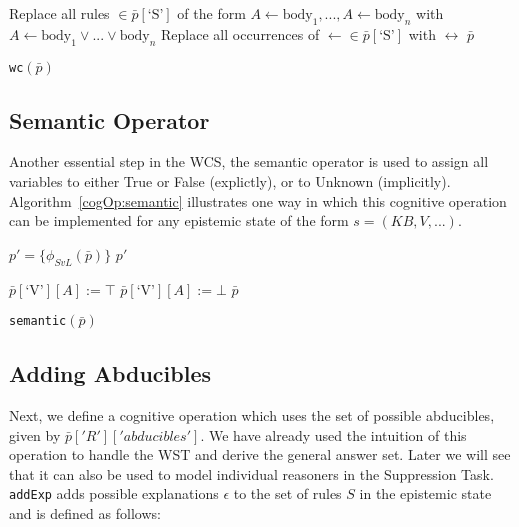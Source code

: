 \begin{algorithm}[H] 
\SetAlgoLined
{}
{
Replace all rules $\in \bar{p}[\textrm{`S'}]$ of the form $A\leftarrow \text{body}_1,...,A\leftarrow \text{body}_n$ with $A\leftarrow \text{body}_1 \lor ... \lor \text{body}_n$ \;
Replace all occurrences of $\leftarrow \in \bar{p}[\textrm{`S'}]$ with $\leftrightarrow$ \;
\Return $\bar{p}$
}

\caption{\texttt{wc}$(\bar{p})$}
\label{cogOp:wc}
\end{algorithm}



\subsection{Semantic Operator}

Another essential step in the WCS, the semantic operator is used to assign all variables to either True or False (explictly), or to Unknown (implicitly). Algorithm~\ref{cogOp:semantic} illustrates one way in which this cognitive operation can be implemented for any epistemic state of the form $s=(KB,V,...)$.

\begin{algorithm}[H] 
\SetAlgoLined
{}
{
$p'= \{\phi_{SvL}(\bar{p})\}$\;
\Return $p'$
}

{
{
{
$\bar{p}[\textrm{`V'}][A]:=\top$
}
}
{
{
$\bar{p}[\textrm{`V'}][A]:=\bot$
}
}
\Return $\bar{p}$
}

\caption{\texttt{semantic}$(\bar{p})$}
\label{cogOp:semantic}
\end{algorithm}

\subsection{Adding Abducibles} \label{ssec:abd}
Next, we define a cognitive operation which uses the set of possible abducibles, given by $\bar{p}['R']['abducibles']$. We have already used the intuition of this operation to handle the WST and derive the general answer set. Later we will see that it can also be used to model individual reasoners in the Suppression Task. \texttt{addExp} adds possible explanations $\epsilon$ to the set of rules $S$ in the epistemic state and is defined as follows:

